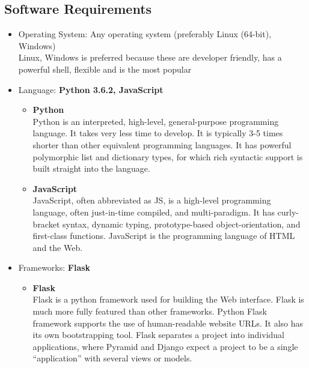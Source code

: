 \documentclass[11pt]{report}
\begin{document}
\subsection{Software Requirements}

\begin{itemize}
\item Operating System: Any operating system (preferably Linux (64-bit), Windows) \\
Linux, Windows is preferred because these are developer friendly, has a powerful shell, flexible and is the most popular  \\

\item Language: \textbf{Python 3.6.2, JavaScript}
\begin{itemize}
    \item \textbf{Python} \\
    Python is an interpreted, high-level, general-purpose programming language. It takes very less time to develop. It is typically 3-5 times shorter than other equivalent programming languages. It has powerful polymorphic list and dictionary types, for which rich syntactic support is built straight into the language.
    \item \textbf{JavaScript} \\
    JavaScript, often abbreviated as JS, is a  high-level programming language, often just-in-time compiled, and multi-paradigm. It has curly-bracket syntax, dynamic typing, prototype-based object-orientation, and first-class functions. JavaScript is the programming language of HTML and the Web.
\end{itemize}

\newpage
\item Frameworks: \textbf{Flask}
\begin{itemize}
    \item \textbf{Flask} \\
    Flask is a python framework used for building the Web interface. Flask is much more fully featured than other frameworks. Python Flask framework supports the use of human-readable website URLs. It also has its own bootstrapping tool. Flask separates a project into individual applications, where Pyramid and Django expect a project to be a single “application” with several views or models.
\end{itemize}


\end{itemize}
\end{document}
